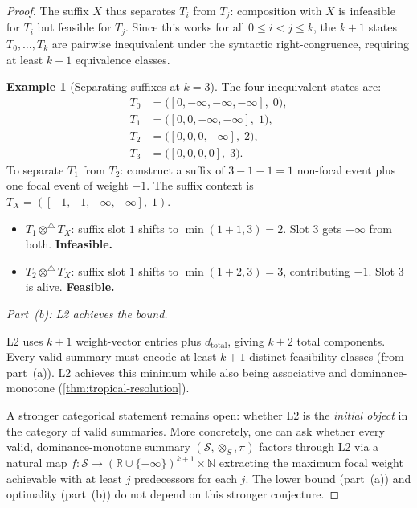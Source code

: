 \documentclass[11pt]{article}
\theoremstyle{plain}
\theoremstyle{definition}
\newtheorem{example}[theorem]{Example}
\theoremstyle{remark}
\newcommand{\R}{\mathbb{R}}
\newcommand{\N}{\mathbb{N}}
\newcommand{\optrop}{\otimes^{\triangle}}
\newcommand{\dtotal}{{d_{\mathrm{total}}}}
\begin{document}
\begin{proof}
The suffix $X$ thus separates $T_i$ from $T_j$: composition with $X$
is infeasible for $T_i$ but feasible for $T_j$.  Since this works for
all $0 \le i < j \le k$, the $k+1$ states $T_0, \ldots, T_k$ are
pairwise inequivalent under the syntactic right-congruence, requiring
at least $k + 1$ equivalence classes.

\begin{example}[Separating suffixes at $k = 3$]\label{ex:myhill-nerode-k3}
The four inequivalent states are:
\begin{align*}
  T_0 &= \bigl([0, -\infty, -\infty, -\infty],\; 0\bigr),\\
  T_1 &= \bigl([0, 0, -\infty, -\infty],\; 1\bigr),\\
  T_2 &= \bigl([0, 0, 0, -\infty],\; 2\bigr),\\
  T_3 &= \bigl([0, 0, 0, 0],\; 3\bigr).
\end{align*}
To separate $T_1$ from $T_2$: construct a suffix of $3 - 1 - 1 = 1$
non-focal event plus one focal event of weight $-1$.  The suffix
context is $T_X = ([-1, -1, -\infty, -\infty],\; 1)$.
\begin{itemize}[nosep]
  \item $T_1 \optrop T_X$: suffix slot $1$ shifts to
    $\min(1 + 1, 3) = 2$.  Slot $3$ gets $-\infty$ from both.
    \textbf{Infeasible.}
  \item $T_2 \optrop T_X$: suffix slot $1$ shifts to
    $\min(1 + 2, 3) = 3$, contributing $-1$.  Slot $3$ is alive.
    \textbf{Feasible.}
\end{itemize}
\end{example}

\emph{Part~(b): L2 achieves the bound.}

L2 uses $k+1$ weight-vector entries plus $\dtotal$, giving $k+2$ total
components.  Every valid summary must encode at least $k+1$ distinct
feasibility classes (from part~(a)).  L2 achieves this minimum while
also being associative and dominance-monotone
(\cref{thm:tropical-resolution}).

A stronger categorical statement remains open: whether L2 is the
\emph{initial object} in the category of valid summaries.  More
concretely, one can ask whether every valid, dominance-monotone summary
$(\mathcal{S}, \otimes_S, \pi)$ factors through L2 via a natural map
$f \colon \mathcal{S} \to (\R \cup \{-\infty\})^{k+1} \times \N$
extracting the maximum focal weight achievable with at least $j$
predecessors for each $j$.  The lower bound (part~(a)) and
optimality (part~(b)) do not depend on this stronger conjecture.
\end{proof}
\end{document}

